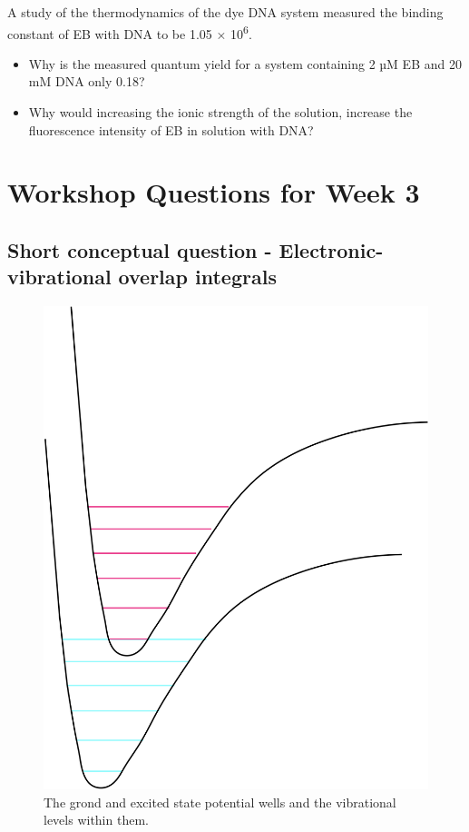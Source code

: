 \documentclass[
]{book}
\begin{document}
A study of the thermodynamics of the dye DNA system measured the binding constant of EB with DNA to be 1.05 × 10\textsuperscript{6}.

\begin{itemize}
\item
  Why is the measured quantum yield for a system containing 2 µM EB and 20 mM DNA only 0.18?
\item
  Why would increasing the ionic strength of the solution, increase the fluorescence intensity of EB in solution with DNA?
\end{itemize}

\hypertarget{ch:Workshop3}{%
\chapter{Workshop Questions for Week 3}\label{ch:Workshop3}}

\hypertarget{sec:overlap}{%
\section{Short conceptual question - Electronic-vibrational overlap integrals}\label{sec:overlap}}

\begin{figure}

{\centering \includegraphics[width=0.7\linewidth]{images/overlap} 

}

\caption{The grond and excited state potential wells and the vibrational levels within them.}\label{fig:overlap}
\end{figure}
\end{document}

